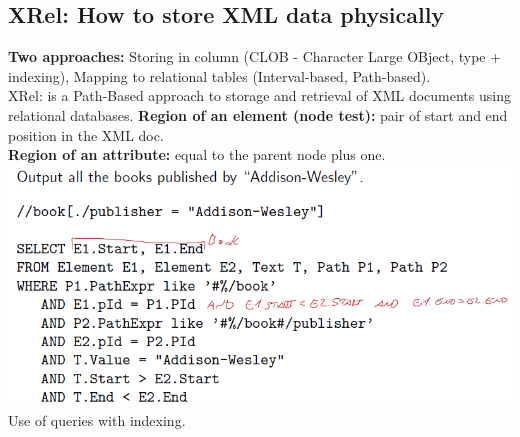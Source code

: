 \documentclass{article}
\begin{document}
\subsection{XRel: How to store XML data physically}
\textbf{Two approaches: }Storing in  column (CLOB - Character Large OBject, type + indexing), Mapping to relational tables (Interval-based, Path-based).\\
XRel: is a Path-Based approach to storage and retrieval of XML documents using
relational databases.
\textbf{Region of an element (node test): }pair of start and end position in the XML doc.\\
\textbf{Region of an attribute: }equal to the parent node plus one.\\
\includegraphics[scale=0.7]{4.png}\\
Use of queries with indexing.
\end{document}
